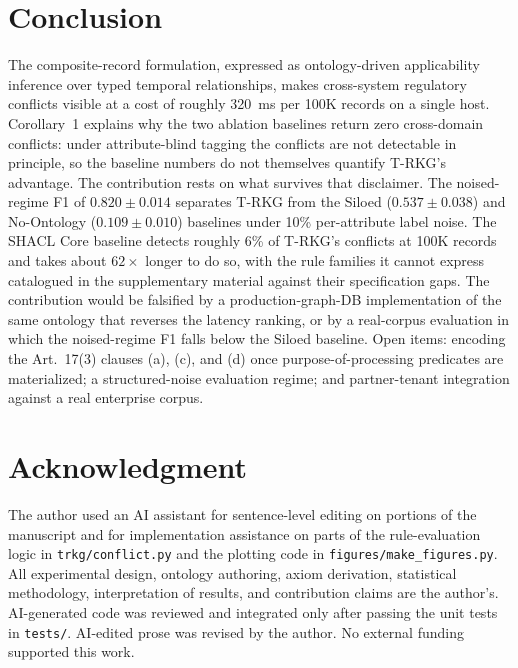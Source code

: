 \documentclass{ieeeaccess}
\begin{document}
\section{Conclusion}

The composite-record formulation, expressed as ontology-driven applicability inference over typed temporal relationships, makes cross-system regulatory conflicts visible at a cost of roughly 320~ms per 100K records on a single host. Corollary~1 explains why the two ablation baselines return zero cross-domain conflicts: under attribute-blind tagging the conflicts are not detectable in principle, so the baseline numbers do not themselves quantify T-RKG's advantage. The contribution rests on what survives that disclaimer. The noised-regime F1 of $0.820 \pm 0.014$ separates T-RKG from the Siloed ($0.537 \pm 0.038$) and No-Ontology ($0.109 \pm 0.010$) baselines under 10\% per-attribute label noise. The SHACL Core baseline detects roughly 6\% of T-RKG's conflicts at 100K records and takes about $62\times$ longer to do so, with the rule families it cannot express catalogued in the supplementary material against their specification gaps. The contribution would be falsified by a production-graph-DB implementation of the same ontology that reverses the latency ranking, or by a real-corpus evaluation in which the noised-regime F1 falls below the Siloed baseline. Open items: encoding the Art.~17(3) clauses (a), (c), and (d) once purpose-of-processing predicates are materialized; a structured-noise evaluation regime; and partner-tenant integration against a real enterprise corpus.

\section*{Acknowledgment}

The author used an AI assistant for sentence-level editing on portions of the manuscript and for implementation assistance on parts of the rule-evaluation logic in \texttt{trkg/conflict.py} and the plotting code in \texttt{figures/make\_figures.py}. All experimental design, ontology authoring, axiom derivation, statistical methodology, interpretation of results, and contribution claims are the author's. AI-generated code was reviewed and integrated only after passing the unit tests in \texttt{tests/}. AI-edited prose was revised by the author. No external funding supported this work.
\end{document}

